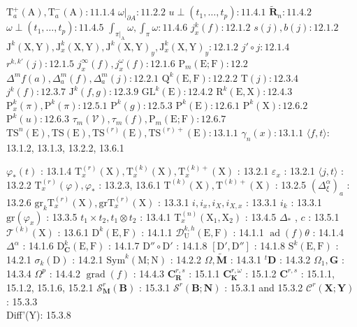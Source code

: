 \(\mathrm{T}_a^+(\mathrm{A}), \mathrm{T}_a^-(\mathrm{A}): 11.1.4\) \(\omega|_{\partial A}: 11.2.2\) \(u \perp (t_1, \ldots, t_p): 11.4.1\) \(\tilde{\mathbf{R}}_n: 11.4.2\) \(\omega \perp (t_1, \ldots, t_p): 11.4.5\) \(\int_{\pi|_{\mathrm{A}}} \omega, \int_{\pi} \omega: 11.4.6\) \(j_x^k(f): 12.1.2\) \(s(j), b(j): 12.1.2\) \(\mathrm{J}^k(\mathrm{X}, \mathrm{Y}), \mathrm{J}_x^k(\mathrm{X}, \mathrm{Y}), \mathrm{J}^k(\mathrm{X}, \mathrm{Y})_y, \mathrm{J}_x^k(\mathrm{X}, \mathrm{Y})_y: 12.1.2\) \(j' \circ j: 12.1.4\) \(r^{k, k'}(j): 12.1.5\) \(j_x^\infty(f), j_x^\omega(f): 12.1.6\) \(\mathrm{P}_m(\mathrm{E}; \mathrm{F}): 12.2\) \(\Delta^m f(a), \Delta_a^m(f), \Delta_a^m(j): 12.2.1\) \(\mathrm{Q}^k(\mathrm{E}, \mathrm{F}): 12.2.2\) \(\mathrm{T}(j): 12.3.4\) \(j^k(f): 12.3.7\) \(\mathrm{J}^k(f, g): 12.3.9\) \(\mathrm{GL}^k(\mathrm{E}): 12.4.2\) \(\mathrm{R}^k(\mathrm{E}, \mathrm{X}): 12.4.3\) \(\mathrm{P}_x^k(\pi), \mathrm{P}^k(\pi): 12.5.1\) \(\mathrm{P}^k(g): 12.5.3\) \(\mathrm{P}^k(\mathrm{E}): 12.6.1\) \(\mathrm{P}^k(\mathrm{X}): 12.6.2\) \(\mathrm{P}^k(u): 12.6.3\) \(\tau_m(\mathcal{V}), \tau_m(f), \mathrm{P}_m(\mathrm{E}; \mathrm{F}): 12.6.7\) \(\mathrm{TS}^n(\mathrm{E}), \mathrm{TS}(\mathrm{E}), \mathrm{TS}^{(r)}(\mathrm{E}), \mathrm{TS}^{(r)+}(\mathrm{E}): 13.1.1\) \(\gamma_n(x): 13.1.1\) \(\langle f, t\rangle\): 13.1.2, 13.1.3, 13.2.2, 13.6.1

\(\varphi_{*}(t)\) : 13.1.4 \(\mathrm{T}_x^{(r)}(\mathrm{X}), \mathrm{T}_x^{(k)}(\mathrm{X}), \mathrm{T}_x^{(k)+}(\mathrm{X})\) : 13.2.1 \(\varepsilon_x\) : 13.2.1 \(\langle j, t \rangle\) : 13.2.2 \(\mathrm{T}_x^{(r)}(\varphi), \varphi_*\) : 13.2.3, 13.6.1 \(\mathrm{T}^{(k)}(\mathrm{X}), \mathrm{T}^{(k)+}(\mathrm{X})\) : 13.2.5 \((\Delta_{\xi}^{\alpha})_a\) : 13.2.6 \(\mathrm{gr}_k \mathrm{T}_x^{(r)}(\mathrm{X}), \mathrm{gr} \mathrm{T}_x^{(r)}(\mathrm{X})\) : 13.3.1 \(i, i_x, i_X, i_{X,x}\) : 13.3.1 \(i_k\) : 13.3.1 \(\mathrm{gr}(\varphi_x)\) : 13.3.5 \(t_1 \times t_2, t_1 \otimes t_2\) : 13.4.1 \(\mathrm{T}_x^{(n)}(\mathrm{X}_1, \mathrm{X}_2)\) : 13.4.5 \(\Delta_*\) , \(c\) : 13.5.1 \(\mathcal{T}^{(k)}(\mathrm{X})\) : 13.6.1 \(\mathrm{D}^k (\mathrm{E}, \mathrm{F})\) : 14.1.1 \(\mathcal{D}_{\mathrm{U}}^{k,h}(\mathrm{E}, \mathrm{F})\) : 14.1.1 \(\operatorname{ad}(f)\theta\) : 14.1.4 \(\Delta^\alpha\) : 14.1.6 \(\mathrm{D}_{\mathbf{C}}^{k}(\mathrm{E}, \mathrm{F})\) : 14.1.7 \(\mathrm{D}'' \circ \mathrm{D}'\) : 14.1.8 \([\mathrm{D}' , \mathrm{D}'']\) : 14.1.8 \(\mathrm{S}^k (\mathrm{E}, \mathrm{F})\) : 14.2.1 \(\sigma_k (\mathrm{D})\) : 14.2.1 \(\mathrm{Sym}^k (\mathrm{M}; \mathrm{N})\) : 14.2.2 \(\Omega, \tilde{\mathbf{M}}\) : 14.3.1 \(^t\mathbf{D}\) : 14.3.2 \(\Omega_1, \mathbf{G}\) : 14.3.4 \(\Omega^p\) : 14.4.2 \(\operatorname{grad}(f)\) : 14.4.3 \(\mathbf{C}_{\mathbf{R}}^{r,s}\) : 15.1.1 \(\mathbf{C}_{\mathbf{K}}^{r,\omega}\) : 15.1.2 \(\mathbf{C}^{r,s}\) : 15.1.1, 15.1.2, 15.1.6, 15.2.1 \(\mathcal{S}_{\mathbf{M}}^r (\mathbf{B})\) : 15.3.1 \(\mathcal{S}^r (\mathbf{B}; \mathbf{N})\) : 15.3.1 and 15.3.2 \(\mathcal{C}^r (\mathbf{X}; \mathbf{Y})\) : 15.3.3\\
Diff'(Y): 15.3.8

